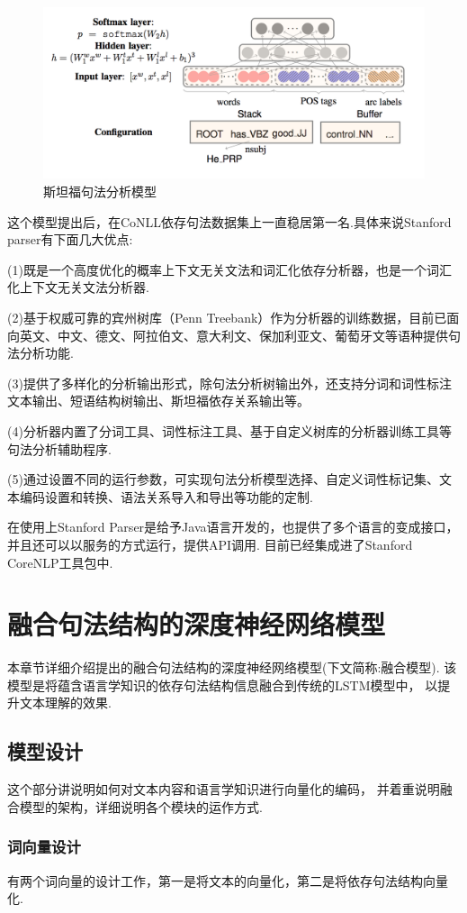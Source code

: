 \documentclass[bachelor,winfonts]{jnuthesis}
\begin{document}
\begin{figure}[h!]
  \centering
  \includegraphics[width=0.85\linewidth]{斯坦福句法分析模型.png}
  \caption{斯坦福句法分析模型}
\end{figure}

这个模型提出后，在CoNLL依存句法数据集上一直稳居第一名.具体来说Stanford parser有下面几大优点:

(1)既是一个高度优化的概率上下文无关文法和词汇化依存分析器，也是一个词汇化上下文无关文法分析器.

(2)基于权威可靠的宾州树库（Penn Treebank）作为分析器的训练数据，目前已面向英文、中文、德文、阿拉伯文、意大利文、保加利亚文、葡萄牙文等语种提供句法分析功能.

(3)提供了多样化的分析输出形式，除句法分析树输出外，还支持分词和词性标注文本输出、短语结构树输出、斯坦福依存关系输出等。

(4)分析器内置了分词工具、词性标注工具、基于自定义树库的分析器训练工具等句法分析辅助程序.

(5)通过设置不同的运行参数，可实现句法分析模型选择、自定义词性标记集、文本编码设置和转换、语法关系导入和导出等功能的定制.

在使用上Stanford Parser是给予Java语言开发的，也提供了多个语言的变成接口，
并且还可以以服务的方式运行，提供API调用.
目前已经集成进了Stanford CoreNLP工具包中.



\chapter{融合句法结构的深度神经网络模型}
本章节详细介绍提出的融合句法结构的深度神经网络模型(下文简称:融合模型).
该模型是将蕴含语言学知识的依存句法结构信息融合到传统的LSTM模型中，
以提升文本理解的效果.
\section{模型设计}
这个部分讲说明如何对文本内容和语言学知识进行向量化的编码，
并着重说明融合模型的架构，详细说明各个模块的运作方式.
\subsection{词向量设计}
有两个词向量的设计工作，第一是将文本的向量化，第二是将依存句法结构向量化.
\end{document}
